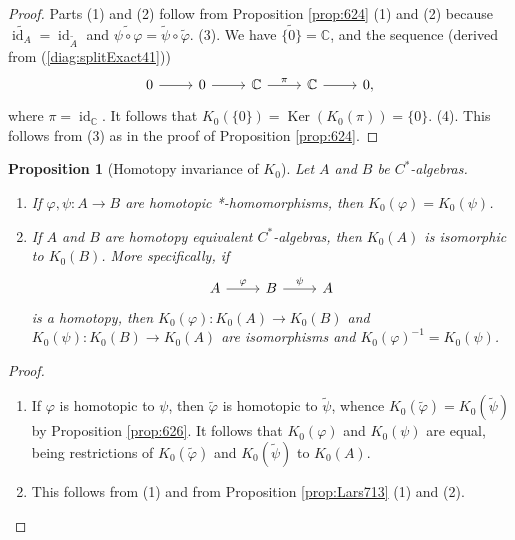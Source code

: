 \documentclass{book}
\newtheorem{proposition}[definition]{Proposition}
\def\cstars{\(C^*\)-algebras}
\begin{document}
\begin{proof}
  Parts (1) and (2) follow from Proposition \ref{prop:624} (1) and (2) because
  \(\widetilde{\operatorname{id}_A}=\operatorname{id}_{\tilde{A}}\) and \(\widetilde{\psi\circ\varphi}=\tilde{\psi}\circ\tilde{\varphi}\).
  (3). We have \(\widetilde{\{0\}}=\mathbb{C}\), and the sequence (derived from (\ref{diag:splitExact41}))
  \begin{equation*}
    \begin{tikzcd}
      0\arrow[r]&0\arrow[r]&\mathbb{C}\arrow[r,"\pi"]&\mathbb{C}\arrow[r]&0,    
    \end{tikzcd}
  \end{equation*}
  where \(\pi=\operatorname{id}_{\mathbb{C}}\). It follows that \(K_0(\{0\})=\operatorname{Ker}(K_0(\pi))=\{0\}\).
  (4). This follows from (3) as in the proof of Proposition \ref{prop:624}.
\end{proof}
\begin{proposition}[Homotopy invariance of \(K_0\)]
  Let \(A\) and \(B\) be \cstars.
  \begin{enumerate}
    \item If \(\varphi,\psi:A\to B\) are homotopic *-homomorphisms, then \(K_0(\varphi)=K_0(\psi)\).
    \item If \(A\) and \(B\) are homotopy equivalent \cstars, then \(K_0(A)\) is isomorphic to \(K_0(B)\). More specifically, if
      \begin{equation*}
        \begin{tikzcd}
          A\arrow[r,"\varphi"]&B\arrow[r,"\psi"]&A    
        \end{tikzcd}
      \end{equation*}
      is a homotopy, then \(K_0(\varphi):K_0(A)\to K_0(B)\) and \(K_0(\psi):K_0(B)\to K_0(A)\)
      are isomorphisms and \(K_0(\varphi)^{-1}=K_0(\psi)\).
  \end{enumerate}
\end{proposition}
\begin{proof}
  \begin{enumerate}
    \item If \(\varphi\) is homotopic to \(\psi\), then \(\tilde{\varphi}\) is homotopic to \(\tilde{\psi}\), whence 
      \(K_0(\tilde{\varphi})=K_0(\tilde{\psi})\) by Proposition \ref{prop:626}. It follows that \(K_0(\varphi)\) and \(K_0(\psi)\) are equal,
      being restrictions of \(K_0(\tilde{\varphi})\) and \(K_0(\tilde{\psi})\) to \(K_0(A)\).
    \item This follows from (1) and from Proposition \ref{prop:Lars713} (1) and (2).
  \end{enumerate}
\end{proof}
\end{document}
